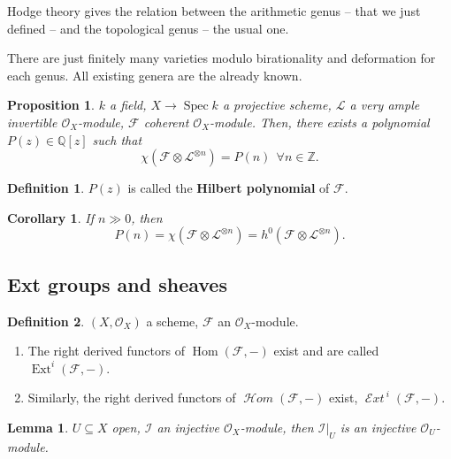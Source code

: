 \documentclass[12pt]{article}
\DeclareMathOperator{\Hom}{Hom}
\DeclareMathOperator{\Spec}{Spec}
\DeclareMathOperator{\shHom}{\mathcal{H}\textit{om}}
\DeclareMathOperator{\Ext}{Ext}
\DeclareMathOperator{\shExt}{\mathcal{E}\textit{xt}\,}
\newtheorem*{proposition}{Proposition}
\newtheorem*{lemma}{Lemma}
\newtheorem*{corollary}{Corollary}
\theoremstyle{definition}
\newtheorem*{definition}{Definition}
\begin{document}
Hodge theory gives the relation between the arithmetic genus -- that we just defined -- and the topological genus -- the usual one.

There are just finitely many varieties modulo birationality and deformation for each genus. All existing genera are the already known.

\begin{proposition}
$k$ a field, $X\rightarrow\Spec k$ a projective scheme, $\mathcal{L}$ a very ample invertible $\mathcal{O}_X$-module, $\mathcal{F}$ coherent $\mathcal{O}_X$-module. Then, there exists a polynomial $P(z)\in\mathbb{Q}[z]$ such that
\[\chi(\mathcal{F}\otimes\mathcal{L}^{\otimes n})=P(n)\ \ \forall n\in\mathbb{Z}.\]
\end{proposition}

\begin{definition}
$P(z)$ is called the \textbf{Hilbert polynomial} of $\mathcal{F}$.
\end{definition}

\begin{corollary}
If $n\gg0$, then
\[P(n)=\chi(\mathcal{F}\otimes\mathcal{L}^{\otimes n})=h^0(\mathcal{F}\otimes\mathcal{L}^{\otimes n}).\]
\end{corollary}

\subsection*{Ext groups and sheaves}
\begin{definition}
$(X,\mathcal{O}_X)$ a scheme, $\mathcal{F}$ an $\mathcal{O}_X$-module.

\begin{enumerate}[label=\arabic*)]
\item The right derived functors of $\Hom(\mathcal{F},-)$ exist and are called $\Ext^i(\mathcal{F},-)$.

\item Similarly, the right derived functors of $\shHom(\mathcal{F},-)$ exist, $\shExt^i(\mathcal{F},-)$.
\end{enumerate}
\end{definition}

\begin{lemma}
$U\subseteq X$ open, $\mathcal{I}$ an injective $\mathcal{O}_X$-module, then $\mathcal{I}|_U$ is an injective $\mathcal{O}_U$-module.
\end{lemma}
\end{document}
